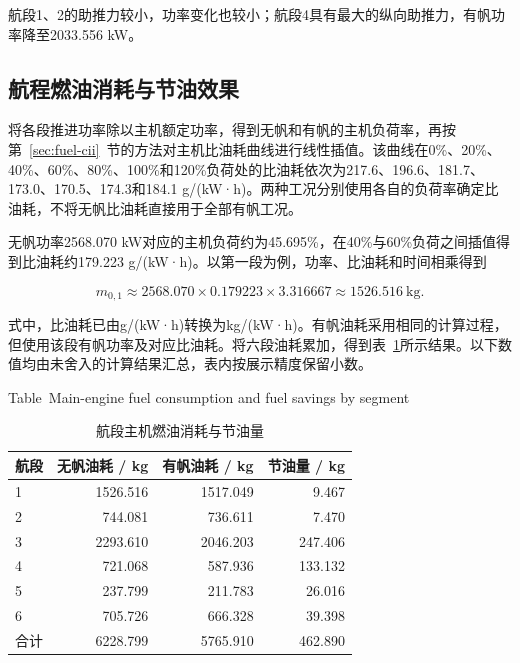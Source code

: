 \documentclass[UTF8,a4paper,twoside,zihao=5,fontset=windows]{ctexart}
\begin{document}
航段1、2的助推力较小，功率变化也较小；航段4具有最大的纵向助推力，有帆功率降至2033.556 kW。

\subsection{航程燃油消耗与节油效果}

将各段推进功率除以主机额定功率，得到无帆和有帆的主机负荷率，再按第~\ref{sec:fuel-cii}~节的方法对主机比油耗曲线进行线性插值。该曲线在0\%、20\%、40\%、60\%、80\%、100\%和120\%负荷处的比油耗依次为217.6、196.6、181.7、173.0、170.5、174.3和184.1 g/(kW·h)。两种工况分别使用各自的负荷率确定比油耗，不将无帆比油耗直接用于全部有帆工况。

无帆功率2568.070 kW对应的主机负荷约为45.695\%，在40\%与60\%负荷之间插值得到比油耗约179.223 g/(kW·h)。以第一段为例，功率、比油耗和时间相乘得到

\begin{equation}
m_{0,1}\approx2568.070\times0.179223\times3.316667
\approx1526.516\ \mathrm{kg}.
\label{eq:case_numeric_1}
\end{equation}

式中，比油耗已由g/(kW·h)转换为kg/(kW·h)。有帆油耗采用相同的计算过程，但使用该段有帆功率及对应比油耗。将六段油耗累加，得到表~\ref{tab:case_fuel}所示结果。以下数值均由未舍入的计算结果汇总，表内按展示精度保留小数。

\begin{table}[htbp]
\centering
\small
\setlength{\tabcolsep}{6pt}
\renewcommand{\arraystretch}{1.4}
\caption{航段主机燃油消耗与节油量}
{\small Table~\thetable\quad Main-engine fuel consumption and fuel savings by segment\par}
\smallskip
\label{tab:case_fuel}
\begin{tabular}{@{}lrrr@{}}
\toprule
航段 & 无帆油耗 / kg & 有帆油耗 / kg & 节油量 / kg \\
\midrule
1 & 1526.516 & 1517.049 & 9.467 \\
2 & 744.081 & 736.611 & 7.470 \\
3 & 2293.610 & 2046.203 & 247.406 \\
4 & 721.068 & 587.936 & 133.132 \\
5 & 237.799 & 211.783 & 26.016 \\
6 & 705.726 & 666.328 & 39.398 \\
合计 & 6228.799 & 5765.910 & 462.890 \\
\bottomrule
\end{tabular}
\end{table}
\FloatBarrier
\end{document}
